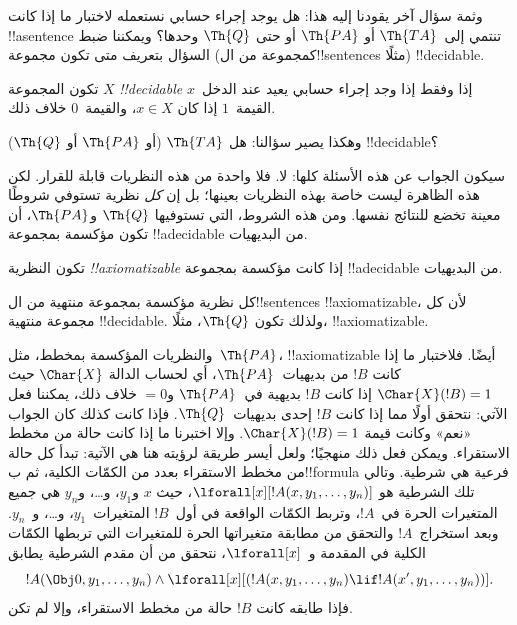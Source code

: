 \documentclass[../../../include/open-logic-section]{subfiles}
\begin{document}
وثمة سؤال آخر يقودنا إليه هذا: هل يوجد إجراء حسابي نستعمله لاختبار
ما إذا كانت !!a{sentence} تنتمي إلى~$\Th{TA}$ أو $\Th{PA}$ أو حتى
$\Th{Q}$ وحدها؟ ويمكننا ضبط السؤال بتعريف متى تكون مجموعة (كمجموعة
من ال!!{sentence}s مثلًا) !!{decidable}.

\begin{defn}
تكون المجموعة $X$ \emph{!!{decidable}} إذا وفقط إذا وجد إجراء حسابي
يعيد عند الدخل~$x$ القيمة~$1$ إذا كان $x\in X$، والقيمة~$0$ خلاف
ذلك.
\end{defn}

وهكذا يصير سؤالنا: هل $\Th{TA}$ (أو $\Th{PA}$ أو $\Th{Q}$)
!!{decidable}؟

سيكون الجواب عن هذه الأسئلة كلها: لا. فلا واحدة من هذه النظريات
قابلة للقرار. لكن هذه الظاهرة ليست خاصة بهذه النظريات بعينها؛ بل إن
\emph{كل} نظرية تستوفي شروطًا معينة تخضع للنتائج نفسها. ومن هذه
الشروط، التي تستوفيها $\Th{Q}$ و$\Th{PA}$، أن تكون مؤكسمة بمجموعة
!!a{decidable} من البديهيات.

\begin{defn}
تكون النظرية \emph{!!{axiomatizable}} إذا كانت مؤكسمة بمجموعة
!!a{decidable} من البديهيات.
\end{defn}

\begin{ex}
كل نظرية مؤكسمة بمجموعة منتهية من ال!!{sentence}s
!!{axiomatizable}، لأن كل مجموعة منتهية !!{decidable}. ولذلك تكون
$\Th{Q}$، مثلًا، !!{axiomatizable}.

والنظريات المؤكسمة بمخطط، مثل~$\Th{PA}$، !!{axiomatizable} أيضًا.
فلاختبار ما إذا كانت $!B$ من بديهيات~$\Th{PA}$، أي لحساب الدالة
$\Char{X}$ حيث $\Char{X}(!B)=1$ إذا كانت $!B$ بديهية في~$\Th{PA}$
و$=0$ خلاف ذلك، يمكننا فعل الآتي: نتحقق أولًا مما إذا كانت $!B$ إحدى
بديهيات~$\Th{Q}$. فإذا كانت كذلك كان الجواب «نعم» وكانت قيمة
$\Char{X}(!B)=1$. وإلا اختبرنا ما إذا كانت حالة من مخطط الاستقراء.
ويمكن فعل ذلك منهجيًا؛ ولعل أيسر طريقة لرؤيته هنا هي الآتية: تبدأ كل
حالة من مخطط الاستقراء بعدد من الكمّات الكلية، ثم ب!!{formula} فرعية
هي شرطية. وتالي تلك الشرطية هو
$\lforall[x][!A(x,y_1,\dots,y_n)]$، حيث $x$ و$y_1$، و\dots، و$y_n$
هي جميع المتغيرات الحرة في~$!A$، وتربط الكمّات الواقعة في أول~$!B$
المتغيرات~$y_1$، و\dots، و~$y_n$. وبعد استخراج~$!A$ والتحقق من
مطابقة متغيراتها الحرة للمتغيرات التي تربطها الكمّات الكلية في
المقدمة و~$\lforall[x]$، نتحقق من أن مقدم الشرطية يطابق
\[
!A(\Obj 0, y_1, \dots, y_n) \land \lforall[x][(!A(x, y_1, \dots, y_n)
\lif !A(x', y_1, \dots, y_n))].
\]
فإذا طابقه كانت $!B$ حالة من مخطط الاستقراء، وإلا لم تكن.
\end{ex}
\end{document}
